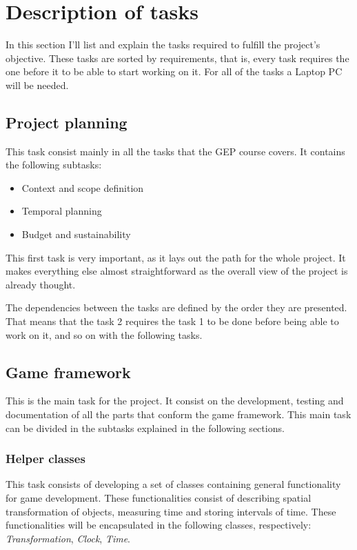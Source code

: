 \section{Description of tasks}

In this section I'll list and explain the tasks required to fulfill the project's 
objective. These tasks are sorted by requirements, that is, every task requires the 
one before it to be able to start working on it. For all of the tasks a Laptop PC 
will be needed.

\subsection{Project planning}

This task consist mainly in all the tasks that the GEP course covers. It contains 
the following subtasks:

\begin{itemize}
\item Context and scope definition
\item Temporal planning
\item Budget and sustainability
\end{itemize}

This first task is very important, as it lays out the path for the whole project. 
It makes everything else almost straightforward as the overall view of the project 
is already thought.

The dependencies between the tasks are defined by the order they are presented. That 
means that the task 2 requires the task 1 to be done before being able to work on 
it, and so on with the following tasks.

\subsection{Game framework}

This is the main task for the project. It consist on the development, testing and 
documentation of all the parts that conform the game framework. This main task can 
be divided in the subtasks explained in the following sections.

\subsubsection{Helper classes}

This task consists of developing a set of classes containing general functionality 
for game development. These functionalities consist of describing spatial transformation 
of objects, measuring time and storing intervals of time. These functionalities will 
be encapsulated in the following classes, respectively: \textit{Transformation},
\textit{Clock}, \textit{Time}.

